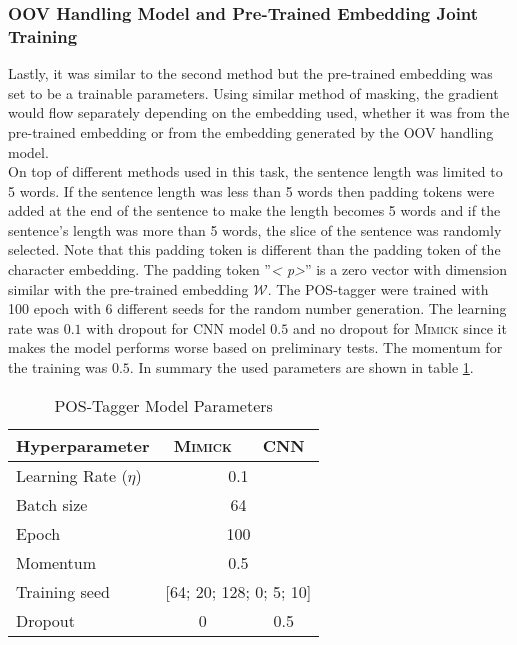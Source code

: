         \subsubsection{OOV Handling Model and Pre-Trained Embedding Joint Training}
        Lastly, it was similar to the second method but the
        pre-trained embedding was set to be a trainable parameters.
        Using similar method of masking, the gradient would flow
        separately depending on the embedding used, whether it was
        from the pre-trained embedding or from the embedding generated
        by the OOV handling model.\\

        On top of different methods used in this task, the sentence
        length was limited to 5 words. If the sentence length was less
        than 5 words then padding tokens were added at the end of the
        sentence to make the length becomes 5 words and if the
        sentence's length was more than 5 words, the slice of the
        sentence was randomly selected. Note that this padding token
        is different than the padding token of the character
        embedding. The padding token ''\textit{\textless
        p\textgreater}'' is a zero vector with dimension similar with
        the pre-trained embedding $\mathcal{W}$. The POS-tagger were
        trained with 100 epoch with 6 different seeds for the random
        number generation. The learning rate was $0.1$ with dropout
        for CNN model $0.5$ and no dropout for \textsc{Mimick} since
        it makes the model performs worse based on preliminary tests.
        The momentum for the training was $0.5$. In summary the used
        parameters are shown in table \ref{tab:hyperparameterpostag}.

        \begin{table}[]
            \centering
            \caption{POS-Tagger Model Parameters}
            \label{tab:hyperparameterpostag}
            \begin{tabular}{@{}lcc@{}}
                \toprule
                \textbf{Hyperparameter} & \multicolumn{1}{c}{\textbf{\textsc{Mimick}}} & \multicolumn{1}{c}{\textbf{CNN}} \\ \midrule
                Learning Rate ($\eta$) & \multicolumn{2}{c}{0.1} \\
                Batch size & \multicolumn{2}{c}{64} \\
                Epoch & \multicolumn{2}{c}{100} \\
                Momentum & \multicolumn{2}{c}{0.5} \\
                Training seed & \multicolumn{2}{c}{[64; 20; 128; 0; 5;
                10]} \\
                Dropout & 0 & 0.5 \\ 
                \bottomrule
            \end{tabular}
        \end{table}

